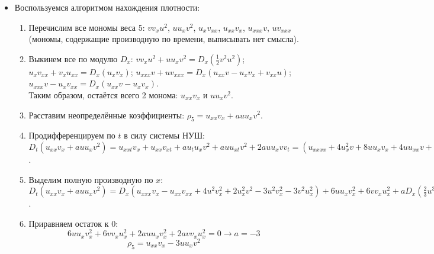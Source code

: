 \documentclass[12pt]{article}
\theoremstyle{definition}
\begin{document}
\begin{itemize}
\begin{enumerate}
$D_t(uv_x)=u_tv_x+uv_{xt}=(u_{xx}+2u^2)v_x+u(-v_{xxx}-2u_xv^2-4uvv_x)=-2u^2vv_x+u_{xx}v_x-uv_{xxx}-2uvv_x)=D_x(-u^2v^2+u_xv_x)-u_xv_{xx}-D_x(uv_{xx})+u_xv_{xx}=D_x(-u^2v^2+u_xv_x-uv_{xx})$.
\begin{equation}
    \boxed{\sigma_3=-u^2v^2+u_xv_x-uv_{xx}}
\end{equation}
\item $\rho_4=uv_{xx}+u^2v^2$.\\
$D_t(uv_{xx}+u^2v^2)=u_tv_{xx}+uv_{xxt}+2uu_tv^2+2u^2vv_t=u_{xx}v_{xx}+u(-v_{xxxx}-4u_xvv_x-4u_xvv_x-4uv_x^2-4uvv_{xx})=u_{xx}v_{xx}-uv_{xxxx}-8uu_xvv_x-4u^2v_x^2-4u^2vv_{xx}=D_x(u_xv_{xx})-u_xv_{xxx}-D_x(uv_{xxx})-D_x(4u^2vv_x)=D_x(u_xv_{xx}-uv_{xxx}-4u^2vv_x)$.
\begin{equation}
    \boxed{\sigma_4=u_xv_{xx}-uv_{xxx}-4u^2vv_x}
\end{equation}
\end{enumerate}
\item[\textbf{ДЗ 3-6.}]
Воспользуемся алгоритмом нахождения плотности:
\begin{enumerate}
    \item Перечислим все мономы веса 5: $vv_xu^2$, $uu_xv^2$, $u_xv_{xx}$, $u_{xx}v_x$, $u_{xxx}v$, $uv_{xxx}$ (мономы, содержащие производную по времени, выписывать нет смысла).
    \item Выкинем все по модулю $D_x$: $vv_xu^2+uu_xv^2=D_x(\frac{1}{2}v^2u^2)$; $u_xv_{xx}+v_xu_{xx}=D_x(u_xv_x)$; $u_{xxx}v+uv_{xxx}=D_x(u_{xx}v-u_xv_x+v_{xx}u)$;  $u_{xxx}v-u_xv_{xx}=D_x(u_{xx}v-u_xv_x)$.\\
    Таким образом, остаётся всего 2 монома: $u_{xx}v_x$ и $uu_xv^2$.
    \item Расставим неопределённые коэффициенты: $\rho_5=u_{xx}v_x+auu_xv^2$.
    \item Продифференцируем по $t$ в силу системы НУШ:\\
    $D_t(u_{xx}v_x+auu_xv^2)=u_{xxt}v_x+u_{xx}v_{xt}+au_tu_xv^2+auu_{xt}v^2+2auu_xvv_t=(u_{xxxx}+4u_x^2v+8uu_xv_x+4uu_{xx}v+2u^2v_{xx})v_x+u_{xx}(-v_{xxx}-2u_xv^2-4uvv_x)+a(u_{xx}+2u^2v)u_xv^2+au(u_{xxx}+4uu_xv+2u^2v_x)v^2+2auu_xv(-v_{xx}-2uv^2)=u_{xxt}v_x+u_{xx}v_{xt}+au_tu_xv^2+auu_{xt}v^2+2auu_xvv_t=(u_{xxxx}+4u_x^2v+8uu_xv_x+2u^2v_{xx})v_x+u_{xx}(-v_{xxx}-2u_xv^2)+a(u_{xx}+2u^2v)u_xv^2+au(u_{xxx}+2u^2v_x)v^2-2auu_xvv_{xx}$.
    \item Выделим полную производную по $x$:\\
    $D_t(u_{xx}v_x+auu_xv^2)=D_x(u_{xxx}v_x-u_{xx}v_{xx}+4u^2v_x^2+2u_x^2v^2-3u^2v_x^2-3v^2u_x^2)+6uu_xv_x^2+6vv_xu_x^2+aD_x(\frac{2}{3}u^3v^2+uu_{xx}v^2-2uu_xvv_x)+2auu_xv^2_x+2avv_xu_x^2$.
    \item Приравняем остаток к 0:
    \begin{equation}
        6uu_xv_x^2+6vv_xu_x^2+2auu_xv^2_x+2avv_xu_x^2=0\rightarrow a=-3
    \end{equation}
    \begin{equation}
        \boxed{\rho_5=u_{xx}v_x-3uu_xv^2}
    \end{equation}
\end{enumerate}
\end{itemize}
\end{document}
